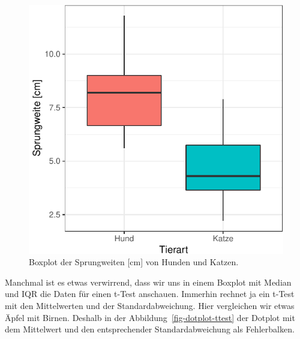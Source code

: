 \documentclass[
  letterpaper,
  DIV=11,
  oneside]{scrreport}
\begin{document}
\begin{figure}

{\centering \includegraphics{./stat-tests-ttest_files/figure-pdf/fig-boxplot-ttest-1.pdf}

}

\caption{\label{fig-boxplot-ttest}Boxplot der Sprungweiten {[}cm{]} von
Hunden und Katzen.}

\end{figure}

Manchmal ist es etwas verwirrend, dass wir uns in einem Boxplot mit
Median und IQR die Daten für einen t-Test anschauen. Immerhin rechnet ja
ein t-Test mit den Mittelwerten und der Standardabweichung. Hier
vergleichen wir etwas Äpfel mit Birnen. Deshalb in der
Abbildung~\ref{fig-dotplot-ttest} der Dotplot mit dem Mittelwert und den
entsprechender Standardabweichung als Fehlerbalken.
\end{document}
